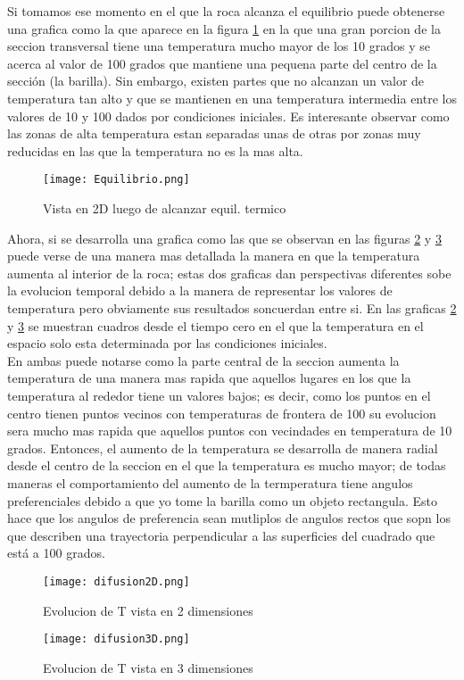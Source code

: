 \documentclass[13pts]{article}
\begin{document}
Si tomamos ese momento en el que la roca alcanza el equilibrio puede obtenerse una grafica como la que aparece en la figura \ref{equil} en la que una gran porcion de la seccion transversal tiene una temperatura mucho mayor de los 10 grados  y se acerca al valor de 100 grados que mantiene una pequena parte del centro de la sección (la barilla). Sin embargo, existen partes que no alcanzan un valor de temperatura tan alto y que se mantienen en una temperatura intermedia entre los valores de 10 y 100 dados por condiciones iniciales. Es interesante observar como las zonas de alta temperatura estan separadas unas de otras por zonas muy reducidas en las que la temperatura no es la mas alta.\\ 
\begin{figure}
	\centering
	\texttt{[image: Equilibrio.png]}
	\caption{Vista en 2D luego de alcanzar equil. termico}
	\label{equil}
\end{figure}
Ahora, si se desarrolla una grafica como las que se observan en las figuras \ref{2D} y \ref{3Di} puede verse de una manera mas detallada la manera en que la temperatura  aumenta al interior de la roca; estas dos graficas dan perspectivas diferentes sobe la evolucion temporal debido a la manera de representar los valores de temperatura pero obviamente sus resultados soncuerdan entre si. En las graficas \ref{2D} y \ref{3Di} se muestran cuadros desde el tiempo cero en el que la temperatura en el espacio solo esta determinada por las condiciones iniciales. \\ 
En ambas puede notarse como la parte central de la seccion aumenta la temperatura de una manera mas rapida que aquellos lugares en los que la temperatura al rededor tiene un valores bajos; es decir, como los puntos en el centro tienen puntos vecinos con temperaturas de frontera de 100 su evolucion sera mucho mas rapida que aquellos puntos con vecindades en temperatura de 10 grados. Entonces, el aumento de la temperatura se desarrolla de manera radial desde el centro de la seccion en el que la temperatura es mucho mayor; de todas maneras el comportamiento del aumento de la termperatura tiene angulos preferenciales debido a que yo tome la barilla como un objeto rectangula. Esto hace que los angulos de preferencia sean mutliplos de angulos rectos que sopn los que describen una trayectoria perpendicular a las superficies del cuadrado que está a 100 grados.\\
\begin{figure}
	\centering
	\texttt{[image: difusion2D.png]}
	\caption{Evolucion de T vista en 2 dimensiones}
	\label{2D}
\end{figure}
\begin{figure}
	\centering
	\texttt{[image: difusion3D.png]}
	\caption{Evolucion de T vista en 3 dimensiones}
	\label{3Di}
\end{figure}\\
\end{document}
